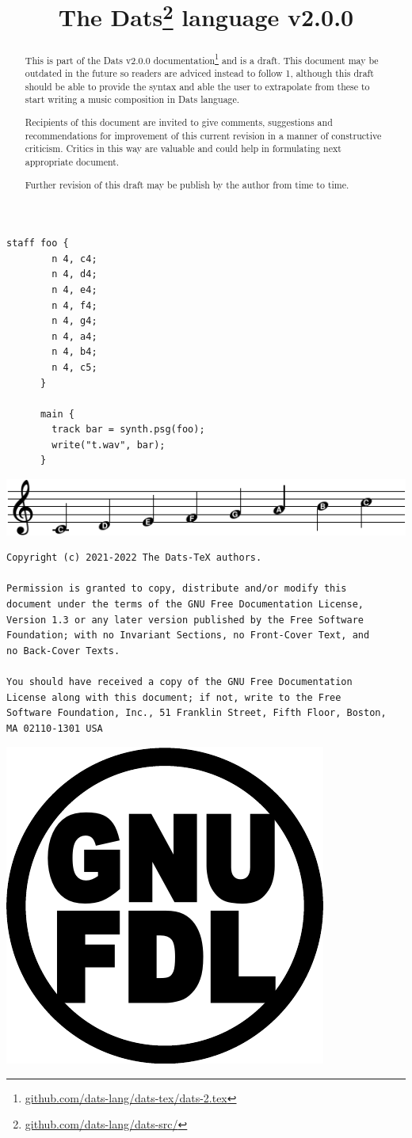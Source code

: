 \documentclass[10pt, twoside]{article}
\title{\textbf{The Dats\thanks{\url{github.com/dats-lang/dats-src/}} language v2.0.0}}
\begin{document}
\maketitle
\thispagestyle{fancy}

\begin{Verbatim}[frame=single, label=The "Hello World" of Dats]
      staff foo {
        n 4, c4;
        n 4, d4;
        n 4, e4;
        n 4, f4;
        n 4, g4;
        n 4, a4;
        n 4, b4;
        n 4, c5;
      }

      main {
        track bar = synth.psg(foo);
        write("t.wav", bar);
      }
\end{Verbatim}
\begin{center}
\includegraphics{notes/cdefgabc}
\end{center}

\vspace{0.5in}
\begin{abstract}
This is part of the Dats v2.0.0 documentation\footnote{\url{github.com/dats-lang/dats-tex/dats-2.tex}}
and is a draft. This document may be outdated in the future so readers are adviced instead to
follow 1, although this draft should be able to provide the syntax and able the user to
extrapolate from these to start writing a music composition in Dats language.


Recipients of this document are invited to give comments, suggestions and recommendations
for improvement of this current revision in a manner of constructive criticism.
Critics in this way are valuable and could help in formulating next appropriate
document.

Further revision of this draft may be publish by the author from time to time.
\end{abstract}

\clearpage
\vspace*{6in}

\begin{minipage}[t]{5in}
\begin{Verbatim}[fontsize=\small]
Copyright (c) 2021-2022 The Dats-TeX authors.

Permission is granted to copy, distribute and/or modify this
document under the terms of the GNU Free Documentation License,
Version 1.3 or any later version published by the Free Software
Foundation; with no Invariant Sections, no Front-Cover Text, and
no Back-Cover Texts. 

You should have received a copy of the GNU Free Documentation
License along with this document; if not, write to the Free
Software Foundation, Inc., 51 Franklin Street, Fifth Floor, Boston,
MA 02110-1301 USA
\end{Verbatim}
\bigskip

\indent \includegraphics[width=.5in]{fdl.pdf}
\end{minipage}
\end{document}
